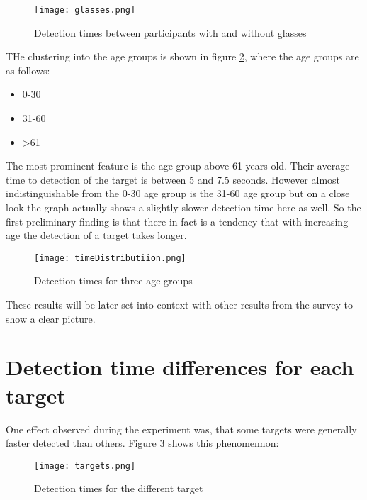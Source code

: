             \begin{figure}[h]     %
                \centering
                \texttt{[image: glasses.png]} 
                \caption{Detection times between participants with and without glasses}\label{glasses}
            \end{figure}

            THe clustering into the age groups is shown in figure \ref*{age-groups}, where the age groups are as follows:

            \begin{itemize}
                \item 0-30
                \item 31-60
                \item >61
            \end{itemize}

            The most prominent feature is the age group above 61 years old. Their average time to detection of the target is between 5 and 7.5 seconds. However almost indistinguishable from the 0-30 age group is the 31-60 age group but on a close look the graph actually shows a slightly slower detection time here as well. So the first preliminary finding is that there in fact is a tendency that with increasing age the detection of a target takes longer.

            \begin{figure}[h]     %
                \centering
                \texttt{[image: timeDistributiion.png]} 
                \caption{Detection times for three age groups}\label{age-groups}
            \end{figure}

            These results will be later set into context with other results from the survey to show a clear picture.



        \section{Detection time differences for each target}

            One effect observed during the experiment was, that some targets were generally faster detected than others. Figure \ref*{targets} shows this phenomennon:

            \begin{figure}[h]     %
                \centering
                \texttt{[image: targets.png]} 
                \caption{Detection times for the different target}\label{targets}
            \end{figure}

